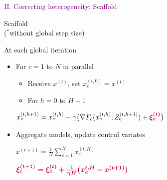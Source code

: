 \documentclass[aspectratio=169,12pt]{beamer}
\begin{document}
\begin{frame}
  \begin{center}
    \huge \textcolor{purple}{
      II. Correcting heterogeneity: Scaffold
      }
  \end{center}
\end{frame}


\begin{frame}[t]{Scaffold ~~~  ~~\\[-0.5em]
  \normalsize ($^*$without global step size) \qquad \qquad \qquad \qquad \qquad \qquad \qquad \qquad \qquad \qquad}  
    

  \begin{minipage}{0.5\linewidth}

  \footnotesize
  At each global iteration

    \begin{itemize}[leftmargin=*,itemsep=0em]
  \footnotesize
    \item For $c=1$ to $N$ in parallel

\vspace{-0.2em}
    
    
\begin{itemize}[leftmargin=*,itemsep=0em]
\item Receive $x^{(t)}$, set $x^{(t,0)}_c = x^{(t)}$
    
        \item For $h=0$ to $H-1$
    \end{itemize}

\vspace{-0.6em}
\begin{center}
            \hspace{-1em}$x^{(t,h+1)}_c = x^{(t,h)}_c - \gamma \big( \nabla F_c( x^{(t,h)}_c ; Z_c^{(t,h+1)}) + \textcolor{purple}{\boldsymbol{\xi_c^{(t)}}} \big)$
        \end{center}
      
  \item Aggregate models, update control variates
        
        
\vspace{-0.6em}
\begin{center}
            \hspace{-1em}$x^{(t+1)} = \frac{1}{N} \sum_{c=1}^N x_c^{(t,H)}$
          \end{center}
\begin{center}
            \hspace{-1em}$\textcolor{purple}{\boldsymbol{\xi_c^{(t+1)} = \xi_c^{(t)} + \frac{1}{\gamma H} (x_c^{t,H} - x^{(t+1)} )}}$
          \end{center}


\end{itemize}
\end{minipage}
\end{frame}
\end{document}
